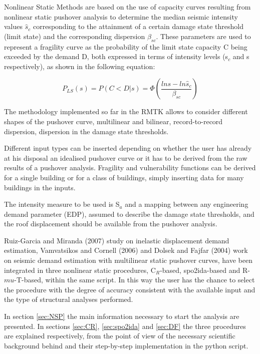 Nonlinear Static Methods are based on the use of capacity curves resulting from nonlinear static pushover analysis to determine the median seismic intensity values $\hat{s}_c$ corresponding to the attainment of a certain damage state threshold (limit state) and the corresponding dispersion $\beta_{sc}$. These parameters are used to represent a fragility curve as the probability of the limit state capacity C being exceeded by the demand D, both expressed in terms of intensity levels (s$_c$ and s respectively), as shown in the following equation:

\begin{equation}
P_{LS}(s) = P(C < D | s) = \Phi(\frac{ln s -ln \hat{s}_c}{\beta_{sc}})
\label{eq:fragility-definition}
\end{equation}

The methodology implemented so far in the RMTK allows to consider different shapes of the pushover curve, multilinear and bilinear, record-to-record dispersion, dispersion in the damage state thresholds. 

Different input types can be inserted depending on whether the user has already at his disposal an idealised pushover curve or it has to be derived from the raw results of a pushover analysis. Fragility and vulnerability functions can be derived for a single building or for a class of buildings, simply inserting data for many buildings in the inputs.

The intensity measure to be used is S$_a$ and a mapping between any engineering demand parameter (EDP), assumed to describe the damage state thresholds, and the roof displacement should be available from the pushover analysis.

Ruiz-Garcia and Miranda (2007) study on inelastic displacement demand estimation, Vamvatsikos and Cornell (2006) and Dolsek and Fajfar (2004) work on seismic demand estimation with multilinear static pushover curves, have been integrated in three nonlinear static procedures, C$_R$-based, spo2ida-based and R-$mu$-T-based, within the same script. In this way the user has the chance to select the procedure with the degree of accuracy consistent with the available input and the type of structural analyses performed. 

In section \ref{sec:NSP} the main information necessary to start the analysis are presented. In sections \ref{sec:CR}, \ref{sec:spo2ida} and \ref{sec:DF} the three procedures are explained respectively, from the point of view of the necessary scientific background behind and their step-by-step implementation in the python script.